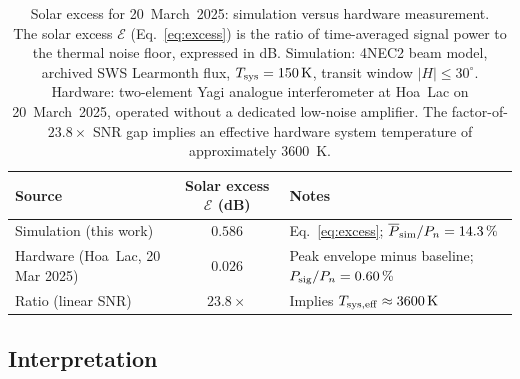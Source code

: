 \begin{table}[H]
  \centering
  \caption[Solar excess for 20~March~2025: simulation versus hardware measurement]{Solar excess for 20~March~2025: simulation versus hardware measurement.\\[4pt]
  The solar excess $\mathcal{E}$ (Eq.~\eqref{eq:excess}) is the ratio of
  time-averaged signal power to the thermal noise floor, expressed in dB.
  Simulation: 4NEC2 beam model, archived SWS Learmonth flux,
  $T_{\rm sys}=\SI{150}{\kelvin}$, transit window $|H|\leq30^\circ$.
  Hardware: two-element Yagi analogue interferometer at Hoa~Lac on
  20~March~2025, operated without a dedicated low-noise amplifier.
  The factor-of-$23.8\times$ SNR gap implies an effective hardware system
  temperature of approximately \SI{3600}{\kelvin}.}
  \label{tab:power-comparison}
  \renewcommand{\arraystretch}{1.3}
  \begin{tabularx}{\textwidth}{l c >{\raggedright\arraybackslash}X}
    \toprule
    \textbf{Source} & \textbf{Solar excess $\mathcal{E}$ (dB)} & \textbf{Notes} \\
    \midrule
    Simulation (this work)
      & $0.586$
      & Eq.~\eqref{eq:excess}; $\overline{P}_{\rm sim}/P_n=14.3\,\%$ \\
    Hardware (Hoa~Lac, 20 Mar 2025)
      & $0.026$
      & Peak envelope minus baseline; $P_{\rm sig}/P_n=0.60\,\%$ \\
    Ratio (linear SNR)
      & $23.8\times$
      & Implies $T_{\rm sys,eff}\approx\SI{3600}{\kelvin}$ \\
    \bottomrule
  \end{tabularx}
\end{table}

\subsection{Interpretation}

